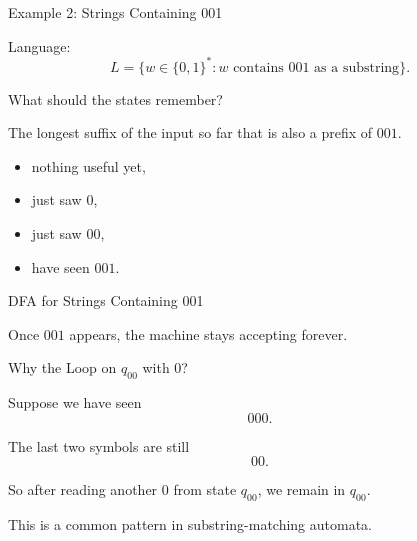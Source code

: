 \documentclass[10pt,aspectratio=169]{beamer}
\begin{document}
\begin{frame}{Example 2: Strings Containing 001}

Language:
\[
L=\{w\in\{0,1\}^*: w\text{ contains }001\text{ as a substring}\}.
\]

\pause

What should the states remember?

\pause

The longest suffix of the input so far that is also a prefix of $001$.

\begin{itemize}
\item nothing useful yet,
\item just saw $0$,
\item just saw $00$,
\item have seen $001$.
\end{itemize}

\end{frame}

\begin{frame}{DFA for Strings Containing 001}

\begin{center}
\end{center}

\vspace{0.5em}

Once $001$ appears, the machine stays accepting forever.

\end{frame}

\begin{frame}{Why the Loop on $q_{00}$ with 0?}

Suppose we have seen
\[
000.
\]

\pause

The last two symbols are still
\[
00.
\]

\pause

So after reading another $0$ from state $q_{00}$, we remain in $q_{00}$.

\vspace{1em}

This is a common pattern in substring-matching automata.

\end{frame}
\end{document}
